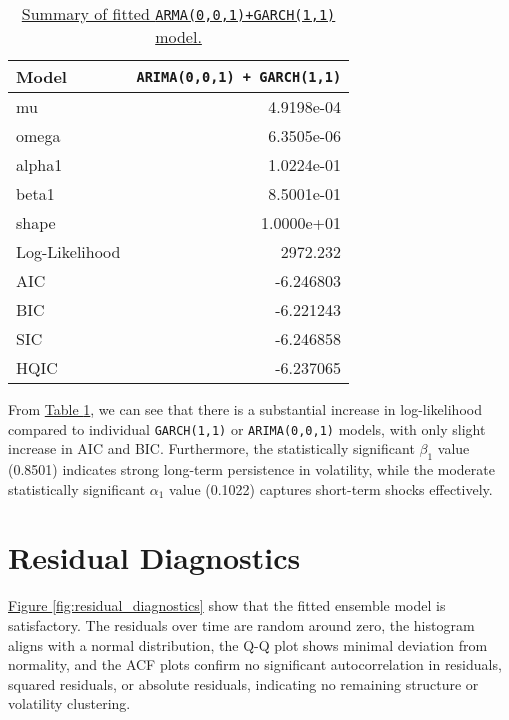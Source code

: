 \documentclass{article}
\newcommand{\1}{\mathbbm{1}}
\theoremstyle{definition}
\begin{document}
\begin{table}[H]
\centering
\begin{tabular}{l|r}
\hline
\textbf{Model}  & \texttt{ARIMA(0,0,1) + GARCH(1,1)} \\
\hline
mu & 4.9198e-04 \\
omega  & 6.3505e-06 \\
alpha1      & 1.0224e-01 \\
beta1 & 8.5001e-01\\
shape & 1.0000e+01\\
\hline
Log-Likelihood  & 2972.232\\
AIC             & -6.246803\\
BIC             & -6.221243\\
SIC             & -6.246858\\
HQIC            & -6.237065\\
\hline
\end{tabular}
\caption{\small{\hyperref[subsec:arma_garch_model_summary]{Summary of fitted \texttt{ARMA(0,0,1)+GARCH(1,1)} model.}}}
\label{tab:arma_garch_model_summary}
\end{table}

From \hyperref[tab:arma_garch_model_summary]{Table \ref{tab:arma_garch_model_summary}}, we can see that there is a substantial increase in log-likelihood compared to individual \texttt{GARCH(1,1)} or \texttt{ARIMA(0,0,1)} models, with only slight increase in AIC and BIC. Furthermore, the statistically significant $\beta_1$ value (0.8501) indicates strong long-term persistence in volatility, while the moderate statistically significant $\alpha_1$ value (0.1022) captures short-term shocks effectively.








\section{Residual Diagnostics}

\hyperref[fig:residual_diagnostics]{Figure \ref{fig:residual_diagnostics}} show that the fitted ensemble model is satisfactory. The residuals over time are random around zero, the histogram aligns with a normal distribution, the Q-Q plot shows minimal deviation from normality, and the ACF plots confirm no significant autocorrelation in residuals, squared residuals, or absolute residuals, indicating no remaining structure or volatility clustering.
\end{document}
